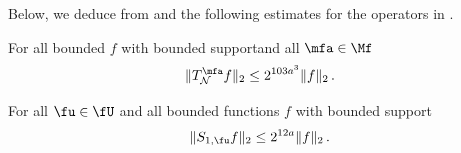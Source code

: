 Below, we deduce  from  and the following estimates for the operators in .

\begin{lemma}
    \label{nontangential-operator-bound}
    \leanok
    For all bounded $f$ with bounded supportand all $\mfa \in \Mf$
    $$
        \|T_{\mathcal{N}}^{\mfa} f\|_2 \le 2^{103a^3} \|f\|_2\,.
    $$
\end{lemma}

\begin{lemma}
    \label{boundary-operator-bound}
    \leanok
    For all $\fu \in \fU$ and all bounded functions $f$ with bounded support
    \begin{equation}
        \label{eq-S-bound}
        \|S_{1,\fu}f\|_2 \le 2^{12a} \|f\|_2\,.
    \end{equation}
\end{lemma}

